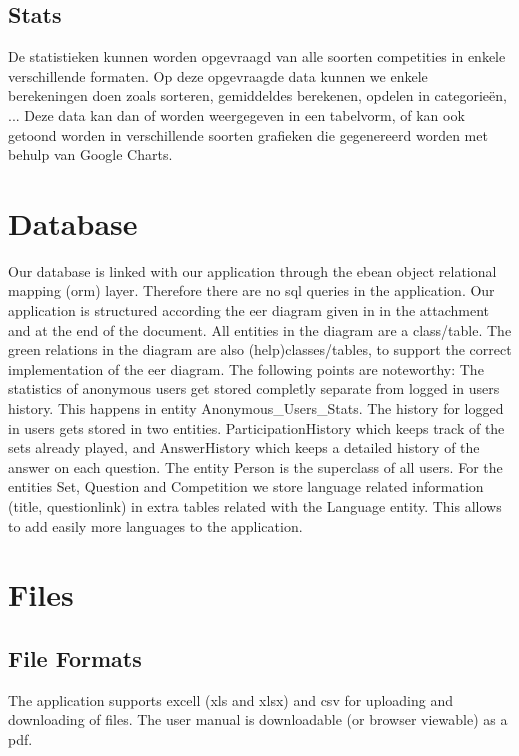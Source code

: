 \documentclass[11pt,a4paper]{article}
\begin{document}
\subsection{Stats}
De statistieken kunnen worden opgevraagd van alle soorten competities in enkele verschillende formaten. Op deze opgevraagde data kunnen we enkele berekeningen doen zoals sorteren, gemiddeldes berekenen, opdelen in categorieën, ... Deze data kan dan of worden weergegeven in een tabelvorm, of kan ook getoond worden in verschillende soorten grafieken die gegenereerd worden met behulp van Google Charts.

\section{Database}
Our database is linked with our application through the ebean object relational mapping (orm) layer. Therefore there are no sql queries in the application. Our application is structured according the eer diagram given in in the attachment and at the end of the document. All entities in the diagram are a class/table. The green relations in the diagram are also (help)classes/tables, to support the correct implementation of the eer diagram. The following points are noteworthy:
The statistics of anonymous users get stored completly separate from logged in users history. This happens in entity Anonymous\_Users\_Stats.
The history for logged in users gets stored in two entities. ParticipationHistory which keeps track of the sets already played, and AnswerHistory which keeps a detailed history of the answer on each question.
The entity Person  is the superclass of all users. 
For the entities Set, Question and Competition we store language related information (title, questionlink) in extra tables related with the Language entity. This allows to add easily more languages to the application.
\section{Files}
\subsection{File Formats}
The application supports excell (xls and xlsx) and csv for uploading and downloading of files. The user manual is downloadable (or browser viewable) as a pdf.
\end{document}
